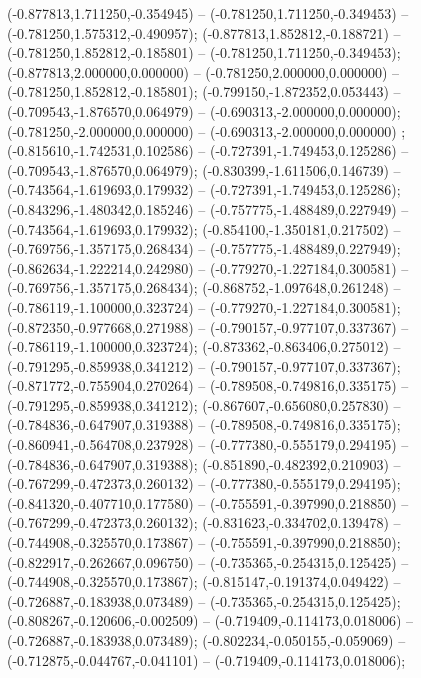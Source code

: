  (-0.877813,1.711250,-0.354945) -- (-0.781250,1.711250,-0.349453) -- (-0.781250,1.575312,-0.490957);
 (-0.877813,1.852812,-0.188721) -- (-0.781250,1.852812,-0.185801) -- (-0.781250,1.711250,-0.349453);
 (-0.877813,2.000000,0.000000) -- (-0.781250,2.000000,0.000000) -- (-0.781250,1.852812,-0.185801);
 (-0.799150,-1.872352,0.053443) -- (-0.709543,-1.876570,0.064979) -- (-0.690313,-2.000000,0.000000);
 (-0.781250,-2.000000,0.000000) -- (-0.690313,-2.000000,0.000000) ;
 (-0.815610,-1.742531,0.102586) -- (-0.727391,-1.749453,0.125286) -- (-0.709543,-1.876570,0.064979);
 (-0.830399,-1.611506,0.146739) -- (-0.743564,-1.619693,0.179932) -- (-0.727391,-1.749453,0.125286);
 (-0.843296,-1.480342,0.185246) -- (-0.757775,-1.488489,0.227949) -- (-0.743564,-1.619693,0.179932);
 (-0.854100,-1.350181,0.217502) -- (-0.769756,-1.357175,0.268434) -- (-0.757775,-1.488489,0.227949);
 (-0.862634,-1.222214,0.242980) -- (-0.779270,-1.227184,0.300581) -- (-0.769756,-1.357175,0.268434);
 (-0.868752,-1.097648,0.261248) -- (-0.786119,-1.100000,0.323724) -- (-0.779270,-1.227184,0.300581);
 (-0.872350,-0.977668,0.271988) -- (-0.790157,-0.977107,0.337367) -- (-0.786119,-1.100000,0.323724);
 (-0.873362,-0.863406,0.275012) -- (-0.791295,-0.859938,0.341212) -- (-0.790157,-0.977107,0.337367);
 (-0.871772,-0.755904,0.270264) -- (-0.789508,-0.749816,0.335175) -- (-0.791295,-0.859938,0.341212);
 (-0.867607,-0.656080,0.257830) -- (-0.784836,-0.647907,0.319388) -- (-0.789508,-0.749816,0.335175);
 (-0.860941,-0.564708,0.237928) -- (-0.777380,-0.555179,0.294195) -- (-0.784836,-0.647907,0.319388);
 (-0.851890,-0.482392,0.210903) -- (-0.767299,-0.472373,0.260132) -- (-0.777380,-0.555179,0.294195);
 (-0.841320,-0.407710,0.177580) -- (-0.755591,-0.397990,0.218850) -- (-0.767299,-0.472373,0.260132);
 (-0.831623,-0.334702,0.139478) -- (-0.744908,-0.325570,0.173867) -- (-0.755591,-0.397990,0.218850);
 (-0.822917,-0.262667,0.096750) -- (-0.735365,-0.254315,0.125425) -- (-0.744908,-0.325570,0.173867);
 (-0.815147,-0.191374,0.049422) -- (-0.726887,-0.183938,0.073489) -- (-0.735365,-0.254315,0.125425);
 (-0.808267,-0.120606,-0.002509) -- (-0.719409,-0.114173,0.018006) -- (-0.726887,-0.183938,0.073489);
 (-0.802234,-0.050155,-0.059069) -- (-0.712875,-0.044767,-0.041101) -- (-0.719409,-0.114173,0.018006);
